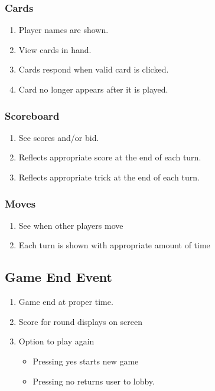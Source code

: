 \documentclass[11pt, titlepage]{article}
\begin{document}
	\subsubsection{Cards}
		\begin{enumerate}
			\item Player names are shown.
			\item View  cards in hand.
			\item Cards respond when valid card is clicked.
			\item Card no longer appears after it is played.
		\end{enumerate}

\subsubsection{Scoreboard}
	\begin{enumerate}
		\item See scores and/or bid.
		\item Reflects appropriate score at the end of each turn.
		\item Reflects appropriate trick at the end of each turn.
	\end{enumerate}


\subsubsection{Moves}
	\begin{enumerate}
		\item  See when other players move
		\item  Each turn is shown with appropriate amount of time
	\end{enumerate}

\subsection{Game End Event}
	\begin{enumerate}
		\item Game end at proper time.
		\item Score for round displays on screen
		\item Option to play again
		\begin{itemize}
			\item Pressing yes starts new game
			\item Pressing no returns user to lobby.
		\end{itemize}
	\end{enumerate}
\end{document}
